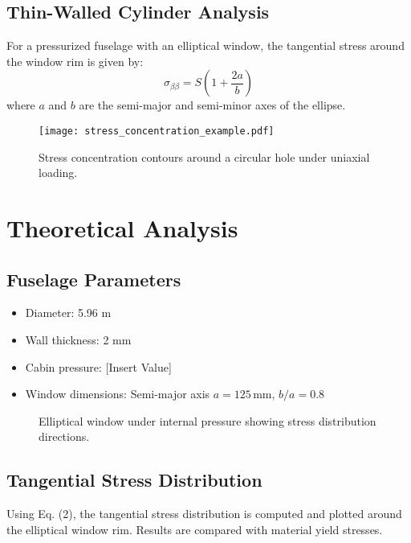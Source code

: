 \documentclass[a4paper,11pt]{article}
\begin{document}
\subsection{Thin-Walled Cylinder Analysis}
For a pressurized fuselage with an elliptical window, the tangential stress around the window rim is given by:
\begin{equation}
    \sigma_{\beta\beta} = S \left( 1 + \frac{2a}{b} \right)
\end{equation}
where \(a\) and \(b\) are the semi-major and semi-minor axes of the ellipse.

\begin{figure}[H]
    \centering
    \texttt{[image: stress\_concentration\_example.pdf]} %
    \caption{Stress concentration contours around a circular hole under uniaxial loading.}
    \label{fig:circular_stress}
\end{figure}

\section{Theoretical Analysis}
\subsection{Fuselage Parameters}
\begin{itemize}
    \item Diameter: 5.96 m
    \item Wall thickness: 2 mm
    \item Cabin pressure: [Insert Value]
    \item Window dimensions: Semi-major axis \(a = 125 \, \text{mm}\), \(b/a = 0.8\)
\end{itemize}

\begin{figure}[H]
    \centering
    \caption{Elliptical window under internal pressure showing stress distribution directions.}
    \label{fig:elliptical_window}
\end{figure}

\subsection{Tangential Stress Distribution}
Using Eq. (2), the tangential stress distribution is computed and plotted around the elliptical window rim. Results are compared with material yield stresses.
\end{document}

